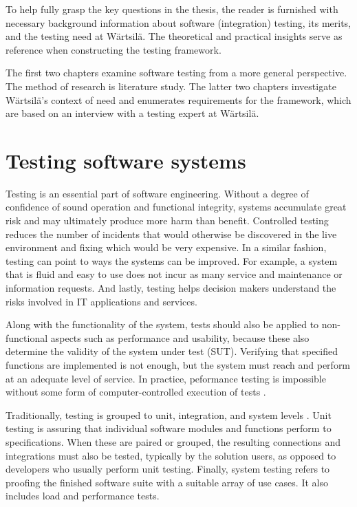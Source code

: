 \documentclass[12pt,a4paper,oneside,pdftex]{report}
\begin{document}

To help fully grasp the key questions in the thesis, the reader is furnished with necessary background information about software (integration) testing, its merits, and the testing need at Wärtsilä. The theoretical and practical insights serve as reference when constructing the testing framework. 

The first two chapters examine software testing from a more general perspective. The method of research is literature study. The latter two chapters investigate Wärtsilä's context of need and enumerates requirements for the framework, which are based on an interview with a testing expert at Wärtsilä.

\section{Testing software systems}

Testing is an essential part of software engineering. Without a degree of confidence of sound operation and functional integrity, systems accumulate great risk and may ultimately produce more harm than benefit. Controlled testing reduces the number of incidents that would otherwise be discovered in the live environment and fixing which would be very expensive. \citep{jenkins2008software, liu2009unified} In a similar fashion, testing can point to ways the systems can be improved. For example, a system that is fluid and easy to use does not incur as many service and maintenance or information requests. And lastly, testing helps decision makers understand the risks involved in IT applications and services.

Along with the functionality of the system, tests should also be applied to non-functional aspects such as performance and usability, because these also determine the validity of the system under test (SUT). Verifying that specified functions are implemented is not enough, but the system must reach and perform at an adequate level of service. In practice, peformance testing is impossible without some form of computer-controlled execution of tests \citep{laukkanen2006data}.

Traditionally, testing is grouped to unit, integration, and system levels \citep{jenkins2008software, burnstein2003practical}. Unit testing is assuring that individual software modules and functions perform to specifications. When these are paired or grouped, the resulting connections and integrations must also be tested, typically by the solution users, as opposed to developers who usually perform unit testing. Finally, system testing refers to proofing the finished software suite with a suitable array of use cases. It also includes load and performance tests. \citep{rehman2007testing}
\end{document}
